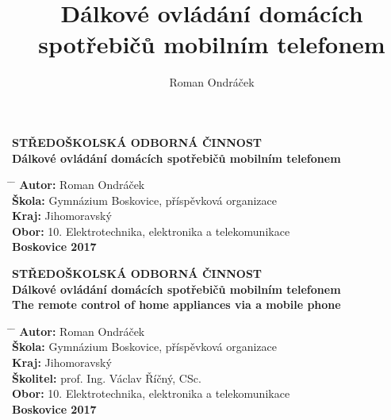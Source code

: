 \documentclass[12pt,a4paper,oneside]{article}
\author{Roman Ondráček}
\title{Dálkové ovládání domácích spotřebičů mobilním telefonem}
\begin{document}
\renewcommand{\baselinestretch}{1.5}
\pagestyle{empty}
\enlargethispage{60mm}
\begin{center}
\large \textbf{STŘEDOŠKOLSKÁ ODBORNÁ ČINNOST} \\

\vspace{32mm}
\huge \textbf{Dálkové ovládání domácích spotřebičů mobilním telefonem} \\

\vspace{64mm}
\end{center}

\begin{tabbing}
\hspace{4mm} \= \hspace{24mm}  \=   \kill
\> \large \textbf{Autor:}  \> \large{Roman Ondráček} \\[4mm]
\> \large \textbf{Škola:}  \> \large{Gymnázium Boskovice, příspěvková organizace} \\[4mm]
\> \large \textbf{Kraj:}  \> \large{Jihomoravský} \\[4mm]
\> \large \textbf{Obor:}  \> \large{10. Elektrotechnika, elektronika a telekomunikace} \\[24mm]
\> \large \textbf{Boskovice 2017}
\end{tabbing}

\newpage

\renewcommand{\baselinestretch}{1.5}
\pagestyle{empty}
\enlargethispage{60mm}
\begin{center}
\large \textbf{STŘEDOŠKOLSKÁ ODBORNÁ ČINNOST} \\

\vspace{32mm}
\huge \textbf{Dálkové ovládání domácích spotřebičů mobilním telefonem} \\
\vspace{16mm}
\huge \textbf{The remote control of home appliances via a mobile phone} \\

\vspace{24mm}
\end{center}

\begin{tabbing}
\hspace{4mm} \= \hspace{24mm}  \=   \kill
\> \large \textbf{Autor:}  \> \large{Roman Ondráček} \\[4mm]
\> \large \textbf{Škola:}  \> \large{Gymnázium Boskovice, příspěvková organizace} \\[4mm]
\> \large \textbf{Kraj:}  \> \large{Jihomoravský} \\[4mm]
\> \large \textbf{Školitel:}  \> \large{prof. Ing. Václav Říčný, CSc.} \\[4mm]
\> \large \textbf{Obor:}  \> \large{10. Elektrotechnika, elektronika a telekomunikace} \\[16mm]
\> \large \textbf{Boskovice 2017}
\end{tabbing}
\end{document}

